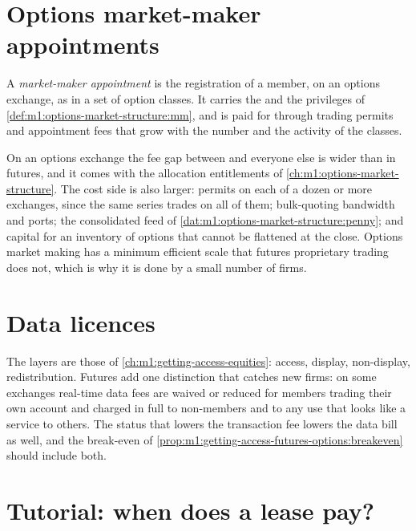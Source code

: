 \section{Options market-maker appointments}

\begin{definition}\label{def:m1:getting-access-futures-options:appointment}
A \emph{market-maker appointment} is the
registration of a member, on an options exchange, as  in a set of
option classes. It carries the  and the privileges of
\cref{def:m1:options-market-structure:mm}, and is paid for through trading
permits and appointment fees that grow with the number and the activity of
the classes.
\end{definition}

On an options exchange the fee gap between  and everyone else
is wider than in futures, and it comes with the allocation entitlements of
\cref{ch:m1:options-market-structure}. The cost side is also larger: permits
on each of a dozen or more exchanges, since the same series trades on all of
them; bulk-quoting bandwidth and ports; the consolidated feed of
\cref{dat:m1:options-market-structure:penny}; and capital for an inventory
of options that cannot be flattened at the close. Options market making has a
minimum efficient scale that futures proprietary trading does not, which is
why it is done by a small number of firms.

\section{Data licences}

The layers are those of \cref{ch:m1:getting-access-equities}: access, display,
non-display, redistribution. Futures add one distinction that catches new
firms: on some exchanges real-time data fees are waived or reduced for
members trading their own account and charged in full to non-members and to
any use that looks like a service to others. The status that lowers the transaction fee
lowers the data bill as well, and the break-even of
\cref{prop:m1:getting-access-futures-options:breakeven} should include both.

\section{Tutorial: when does a lease pay?}\label{tut:m1:getting-access-futures-options:lease}

